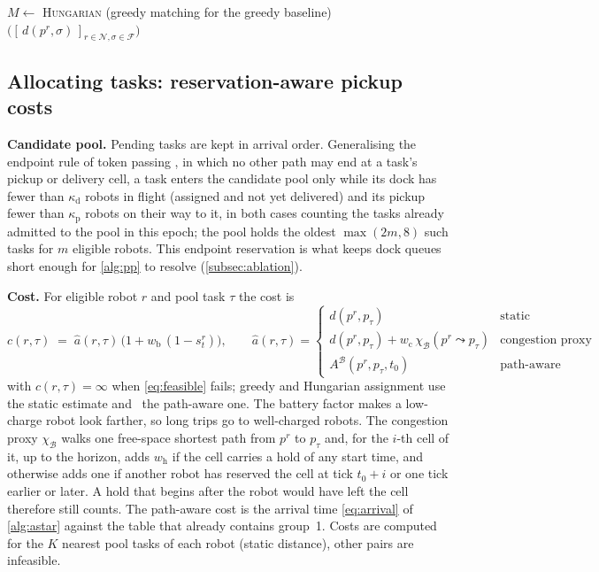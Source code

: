 \begin{algorithm}[t]
\caption{Charger assignment (one epoch)}\label{alg:charge}
$M\gets$ \textsc{Hungarian} (greedy matching for the greedy baseline)$\bigl([\,d(p^r,\sigma)\,]_{r\in\mathcal{N},\sigma\in\mathcal{F}}\bigr)$\;
\end{algorithm}

\subsection{Allocating tasks: reservation-aware pickup costs}\label{subsec:alloc}

\noindent\textbf{Candidate pool.}
Pending tasks are kept in arrival order. Generalising the endpoint rule of
token passing \citep{ma2017lifelong}, in which no other path may end at a
task's pickup or delivery cell, a task enters the candidate pool only while its dock
has fewer than $\kappa_{\mathrm{d}}$ robots in flight (assigned and not yet
delivered) and its pickup fewer than $\kappa_{\mathrm{p}}$ robots on their
way to it, in both cases counting the tasks already admitted to the pool in
this epoch; the pool holds
the oldest $\max(2m,8)$ such tasks for $m$ eligible robots. This endpoint
reservation is what keeps dock queues short enough for \cref{alg:pp} to
resolve (\cref{subsec:ablation}).

\noindent\textbf{Cost.}
For eligible robot $r$ and pool task $\tau$ the cost is
\begin{equation}\label{eq:cost}
  c(r,\tau) \;=\; \hat a(r,\tau)\,\bigl(1 + w_{\mathrm{b}}\,(1-s^r_t)\bigr),
\qquad
  \hat a(r,\tau) =
  \begin{cases}
    d(p^r,p_\tau) & \text{static}\\[2pt]
    d(p^r,p_\tau) + w_{\mathrm{c}}\,\chi_{\mathcal{B}}(p^r\!\leadsto\!p_\tau) & \text{congestion proxy}\\[2pt]
    A^{\mathcal{B}}(p^r,p_\tau,t_0) & \text{path-aware}
  \end{cases}
\end{equation}
with $c(r,\tau)=\infty$ when \cref{eq:feasible} fails; greedy and Hungarian
assignment use the static estimate and \sname\ the path-aware one. The battery factor
makes a low-charge robot look farther, so long trips go to well-charged
robots. The congestion proxy $\chi_{\mathcal{B}}$ walks one free-space shortest path
from $p^r$ to $p_\tau$ and, for the $i$-th cell of it, up to the horizon, adds
$w_{\mathrm{h}}$ if the cell carries a hold of any start time, and otherwise
adds one if another robot has reserved the cell at tick $t_0+i$ or one tick
earlier or later. A hold that begins after the robot would have left the cell
therefore still counts. The path-aware cost is the arrival time
\cref{eq:arrival} of \cref{alg:astar} against the table that already contains
group~1. Costs are computed for the $K$ nearest pool tasks of each robot
(static distance), other pairs are infeasible.

